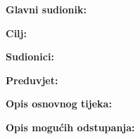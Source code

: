 \noindent {}
\begin{packed_item}

	\item \textbf{Glavni sudionik: }
	\item  \textbf{Cilj:}
	\item  \textbf{Sudionici:}
	\item  \textbf{Preduvjet:}
	\item  \textbf{Opis osnovnog tijeka:}

	\item[] \begin{packed_enum}

		\item
		\item
		\item
		\item
		\item
	\end{packed_enum}

	\item  \textbf{Opis mogućih odstupanja:}

	\item[] \begin{packed_item}

		\item[2.a]
		\item[] \begin{packed_enum}

			\item
			\item

		\end{packed_enum}
		\item[2.b]
		\item[3.a]

	\end{packed_item}
\end{packed_item}

